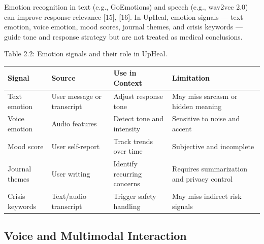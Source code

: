 \documentclass[
  letterpaper,
  12pt,
  a4paper,
  openany]{report}
\newcounter{none} %
\begin{document}
Emotion recognition in text (e.g., GoEmotions) and speech (e.g., wav2vec
2.0) can improve response relevance {[}15{]}, {[}16{]}. In UpHeal,
emotion signals --- text emotion, voice emotion, mood scores, journal
themes, and crisis keywords --- guide tone and response strategy but are
not treated as medical conclusions.

Table 2.2: Emotion signals and their role in UpHeal.

{\def\LTcaptype{none} %
\begin{longtable}[]{@{}
  >{\raggedright\arraybackslash}p{}
  >{\raggedright\arraybackslash}p{}
  >{\raggedright\arraybackslash}p{}
  >{\raggedright\arraybackslash}p{}@{}}
\toprule\noalign{}
\begin{minipage}[b]{\linewidth}\raggedright
Signal
\end{minipage} & \begin{minipage}[b]{\linewidth}\raggedright
Source
\end{minipage} & \begin{minipage}[b]{\linewidth}\raggedright
Use in Context
\end{minipage} & \begin{minipage}[b]{\linewidth}\raggedright
Limitation
\end{minipage} \\
\midrule\noalign{}
\endhead
\bottomrule\noalign{}
\endlastfoot
Text emotion & User message or transcript & Adjust response tone & May
miss sarcasm or hidden meaning \\
Voice emotion & Audio features & Detect tone and intensity & Sensitive
to noise and accent \\
Mood score & User self-report & Track trends over time & Subjective and
incomplete \\
Journal themes & User writing & Identify recurring concerns & Requires
summarization and privacy control \\
Crisis keywords & Text/audio transcript & Trigger safety handling & May
miss indirect risk signals \\
\end{longtable}
}

\subsection{Voice and Multimodal
Interaction}\label{voice-and-multimodal-interaction}
\end{document}

